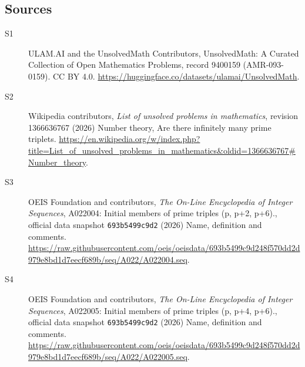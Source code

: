 \documentclass[11pt]{article}
\begin{document}
\subsection{Sources}
\begin{description}
\item[\hypertarget{source:9400159:1}{S1}] ULAM.AI and the UnsolvedMath Contributors, UnsolvedMath: A Curated Collection of Open Mathematics Problems, record 9400159 (AMR-093-0159). CC BY 4.0. \url{https://huggingface.co/datasets/ulamai/UnsolvedMath}.
\item[\hypertarget{source:9400159:2}{S2}] Wikipedia contributors, \emph{List of unsolved problems in mathematics}, revision 1366636767 (2026) Number theory, Are there infinitely many prime triplets. \url{https://en.wikipedia.org/w/index.php?title=List_of_unsolved_problems_in_mathematics&oldid=1366636767#Number_theory}.
\item[\hypertarget{source:9400159:3}{S3}] OEIS Foundation and contributors, \emph{The On-Line Encyclopedia of Integer Sequences}, A022004: Initial members of prime triples (p, p+2, p+6)., official data snapshot \texttt{693b5499c9d2} (2026) Name, definition and comments. \url{https://raw.githubusercontent.com/oeis/oeisdata/693b5499c9d248f570dd2d979e8bd1d7eecf689b/seq/A022/A022004.seq}.
\item[\hypertarget{source:9400159:4}{S4}] OEIS Foundation and contributors, \emph{The On-Line Encyclopedia of Integer Sequences}, A022005: Initial members of prime triples (p, p+4, p+6)., official data snapshot \texttt{693b5499c9d2} (2026) Name, definition and comments. \url{https://raw.githubusercontent.com/oeis/oeisdata/693b5499c9d248f570dd2d979e8bd1d7eecf689b/seq/A022/A022005.seq}.
\end{description}
\label{end:9400159}
\end{document}
